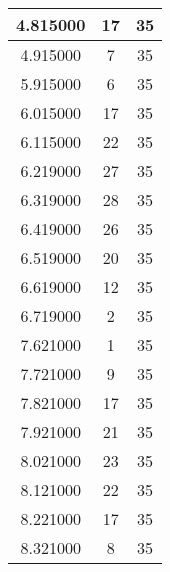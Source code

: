 \begin{longtable}[htbp]{|c|c|c|}
4.815000 & 17 & 35 \\ \hline
4.915000 & 7 & 35 \\ \hline
5.915000 & 6 & 35 \\ \hline
6.015000 & 17 & 35 \\ \hline
6.115000 & 22 & 35 \\ \hline
6.219000 & 27 & 35 \\ \hline
6.319000 & 28 & 35 \\ \hline
6.419000 & 26 & 35 \\ \hline
6.519000 & 20 & 35 \\ \hline
6.619000 & 12 & 35 \\ \hline
6.719000 & 2 & 35 \\ \hline
7.621000 & 1 & 35 \\ \hline
7.721000 & 9 & 35 \\ \hline
7.821000 & 17 & 35 \\ \hline
7.921000 & 21 & 35 \\ \hline
8.021000 & 23 & 35 \\ \hline
8.121000 & 22 & 35 \\ \hline
8.221000 & 17 & 35 \\ \hline
8.321000 & 8 & 35 \\ \hline
\end{longtable}

